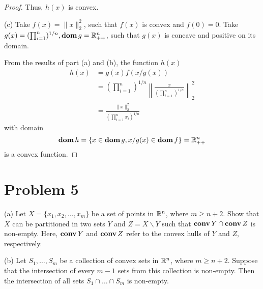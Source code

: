 \documentclass[11pt]{article}
\begin{document}
\begin{proof}
Thus, $h(x)$ is convex.

(c)
Take $f(x) = \|x\|_2^2$, such that $f(x)$ is convex and $f(0) = 0$.
Take $g(x) = (\prod_{i=1}^{n})^{1/n}, \mathop{\textbf{dom}} g = {{\mathbb{R}}}^n_{++}$, such that $g(x)$ is concave and positive on its domain.

From the results of part (a) and (b), the function $h(x)$
\begin{align*}
    h(x) & = g(x) f(x/g(x)) \\
    & = (\prod_{i=1}^{n})^{1/n} \left\|\frac{x}{(\prod_{i=1}^{n})^{1/n}}\right\|_2^2\\
    & = \frac{\|x\|_2^2}{(\prod_{i=1}^{n}x_i)^{1/n}}
\end{align*}
with domain
\[
\mathop{\textbf{dom}} h = \{x\in\mathop{\textbf{dom}} g, x/g(x) \in \mathop{\textbf{dom}} f\} = {{\mathbb{R}}}^n_{++}
\]
is a convex function.

\end{proof}


\clearpage
\section*{Problem 5}
(a) Let $X = \{x_1, x_2, \dots, x_m\}$ be a set of points in ${{\mathbb{R}}}^n$, where $m\geq n+2$. Show that $X$ can be partitioned in two sets $Y$ and $Z = X\backslash Y$ such that $\mathop {\textbf{conv}} Y \cap \mathop {\textbf{conv}} Z$ is non-empty. Here, $\mathop {\textbf{conv}} Y$ and $\mathop {\textbf{conv}} Z$ refer to the convex hulls of $Y$ and $Z$, respectively.

(b) Let $S_1, \dots, S_m$ be a collection of convex sets in ${{\mathbb{R}}}^n$, where $m\geq n + 2$. Suppose that the intersection of every $m-1$ sets from this collection is non-empty. Then the intersection of all sets $S_1\cap\dots\cap S_m$ is non-empty.
\end{document}
